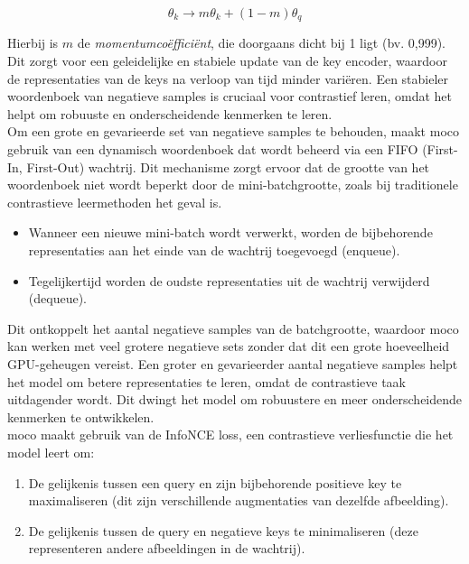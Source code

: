 $$
\theta_k \rightarrow m\theta_k + (1 - m)\theta_q
$$

Hierbij is $m$ de \emph{momentumcoëfficiënt}, die doorgaans dicht bij 1 ligt (bv. 0,999). Dit zorgt voor een geleidelijke en stabiele update van de key encoder, waardoor de representaties van de keys na verloop van tijd minder variëren. Een stabieler woordenboek van negatieve samples is cruciaal voor contrastief leren, omdat het helpt om robuuste en onderscheidende kenmerken te leren. \\

Om een grote en gevarieerde set van negatieve samples te behouden, maakt \gls{moco} gebruik van een dynamisch woordenboek dat wordt beheerd via een FIFO (First-In, First-Out) wachtrij. Dit mechanisme zorgt ervoor dat de grootte van het woordenboek niet wordt beperkt door de mini-batchgrootte, zoals bij traditionele contrastieve leermethoden het geval is.

\begin{itemize}
    \item Wanneer een nieuwe mini-batch wordt verwerkt, worden de bijbehorende representaties aan het einde van de wachtrij toegevoegd (enqueue).
    \item Tegelijkertijd worden de oudste representaties uit de wachtrij verwijderd (dequeue).
\end{itemize}

Dit ontkoppelt het aantal negatieve samples van de batchgrootte, waardoor \gls{moco} kan werken met veel grotere negatieve sets zonder dat dit een grote hoeveelheid GPU-geheugen vereist. Een groter en gevarieerder aantal negatieve samples helpt het model om betere representaties te leren, omdat de contrastieve taak uitdagender wordt. Dit dwingt het model om robuustere en meer onderscheidende kenmerken te ontwikkelen. \\

\gls{moco} maakt gebruik van de InfoNCE loss, een contrastieve verliesfunctie die het model leert om:

\begin{enumerate}
    \item De gelijkenis tussen een query en zijn bijbehorende positieve key te maximaliseren (dit zijn verschillende augmentaties van dezelfde afbeelding).
    \item De gelijkenis tussen de query en negatieve keys te minimaliseren (deze representeren andere afbeeldingen in de wachtrij).
\end{enumerate}

